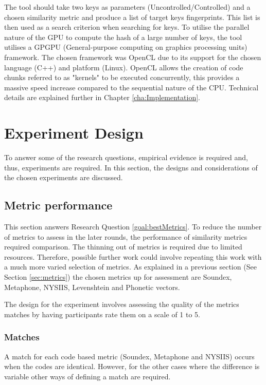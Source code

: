 The tool should take two keys as parameters (Uncontrolled/Controlled) and a chosen similarity metric and produce a list of target keys fingerprints. This list is then used as a search criterion when searching for keys. To utilise the parallel nature of the GPU to compute the hash of a large number of keys, the tool utilises a GPGPU (General-purpose computing on graphics processing units) framework. The chosen framework was OpenCL due to its support for the chosen language (C++) and platform (Linux). OpenCL allows the creation of code chunks referred to as "kernels" to be executed concurrently, this provides a massive speed increase compared to the sequential nature of the CPU. Technical details are explained further in Chapter \ref{cha:Implementation}.

\section{Experiment Design}
To answer some of the research questions, empirical evidence is required and, thus, experiments are required. In this section, the designs and considerations of the chosen experiments are discussed.

\subsection{Metric performance}
\label{exp:metric}
This section answers Research Question \ref{goal:bestMetrics}. To reduce the number of metrics to assess in the later rounds, the performance of similarity metrics required comparison. The thinning out of metrics is required due to limited resources. Therefore, possible further work could involve repeating this work with a much more varied selection of metrics. As explained in a previous section (See Section \ref{sec:metrics}) the chosen metrics up for assessment are Soundex, Metaphone, NYSIIS, Levenshtein and Phonetic vectors.

The design for the experiment involves assessing the quality of the metrics matches by having participants rate them on a scale of 1 to 5.

\subsubsection{Matches}
A match for each code based metric (Soundex, Metaphone and NYSIIS) occurs when the codes are identical. However, for the other cases where the difference is variable other ways of defining a match are required.


